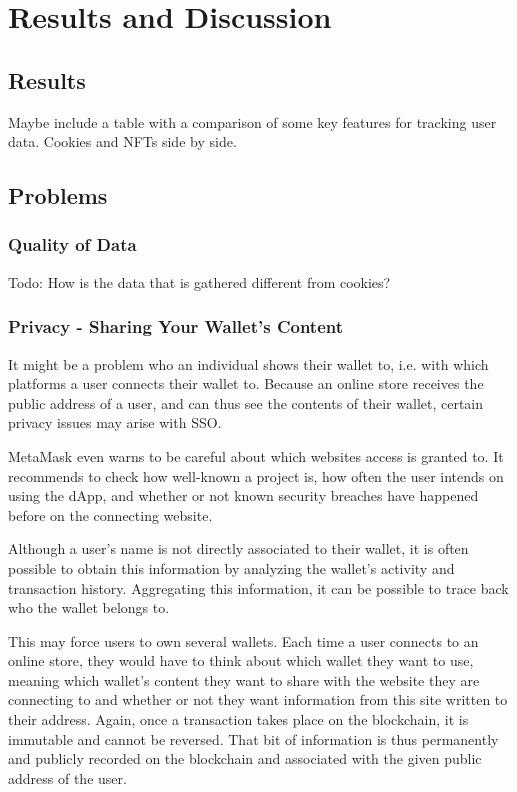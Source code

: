 \chapter{Results and Discussion}
\label{ch:results}


%
%
\section{Results}
\label{sec:results:results}
Maybe include a table with a comparison of some key features for tracking user data. Cookies and NFTs side by side.


%
%
\section{Problems}
\label{sec:results:problems}

\subsection{Quality of Data}
\label{sub:results:data}
Todo: How is the data that is gathered different from cookies?



\subsection{Privacy - Sharing Your Wallet's Content}
\label{sec:results:walletContent}
It might be a problem who an individual shows their wallet to, i.e. with which platforms a user connects their wallet to. Because an online store receives the public address of a user, and can thus see the contents of their wallet, certain privacy issues may arise with SSO.

MetaMask even warns to be careful about which websites access is granted to. It recommends to check how well-known a project is, how often the user intends on using the dApp, and whether or not known security breaches have happened before on the connecting website. \cite{metaMask}

Although a user's name is not directly associated to their wallet, it is often possible to obtain this information by analyzing the wallet's activity and transaction history. Aggregating this information, it can be possible to trace back who the wallet belongs to.

This may force users to own several wallets. Each time a user connects to an online store, they would have to think about which wallet they want to use, meaning which wallet's content they want to share with the website they are connecting to and whether or not they want information from this site written to their address. Again, once a transaction takes place on the blockchain, it is immutable and cannot be reversed. That bit of information is thus permanently and publicly recorded on the blockchain and associated with the given public address of the user.


